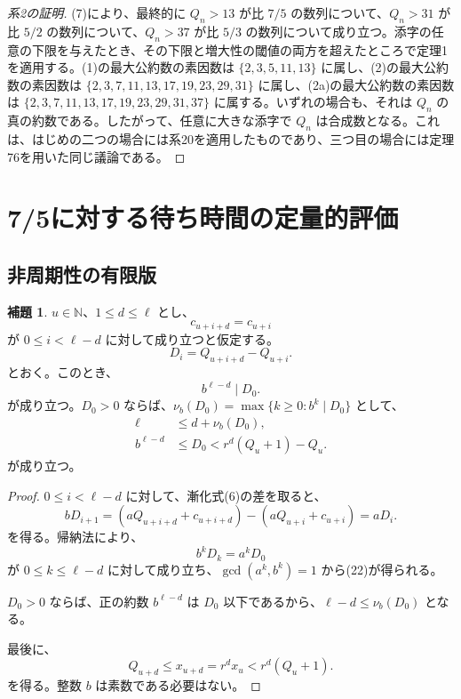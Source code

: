\documentclass[11pt,reqno]{amsart}
\theoremstyle{definition}
\newtheorem{lemma}[theorem]{補題}
\theoremstyle{definition}
\theoremstyle{remark}
\begin{document}
\begin{proof}[系2の証明]\leavevmode\label{proof:2}
(7)により、最終的に \(Q_n>13\) が比 \(7/5\) の数列について、\(Q_n>31\) が比 \(5/2\) の数列について、\(Q_n>37\) が比 \(5/3\) の数列について成り立つ。添字の任意の下限を与えたとき、その下限と増大性の閾値の両方を超えたところで定理1を適用する。(1)の最大公約数の素因数は \(\{2,3,5,11,13\}\) に属し、(2)の最大公約数の素因数は \(\{2,3,7,11,13,17,19,23,29,31\}\) に属し、(2a)の最大公約数の素因数は \(\{2,3,7,11,13,17,19,23,29,31,37\}\) に属する。いずれの場合も、それは \(Q_n\) の真の約数である。したがって、任意に大きな添字で \(Q_n\) は合成数となる。これは、はじめの二つの場合には系20を適用したものであり、三つ目の場合には定理76を用いた同じ議論である。\qedhere
\end{proof}

\section{7/5に対する待ち時間の定量的評価}\label{sec:6}

\subsection{非周期性の有限版}\label{sec:6.1}

\begin{samepage}
\begin{lemma}\leavevmode\label{thm:25}
\(u\in\mathbb N\)、\(1\le d\le\ell\) とし、
\[
c_{u+i+d}=c_{u+i}
\]
が \(0\le i<\ell-d\) に対して成り立つと仮定する。
\[
D_i=Q_{u+i+d}-Q_{u+i}.
\]
とおく。このとき、
\[
b^{\ell-d}\mid D_0.
\tag{22}\label{eq:22}
\]
が成り立つ。\(D_0>0\) ならば、\(\nu_b(D_0)=\max\{k\ge0:b^k\mid D_0\}\) として、
\[
\begin{aligned}
\ell&\le d+\nu_b(D_0),\\
b^{\ell-d}&\le D_0<r^d(Q_u+1)-Q_u.
\end{aligned}
\tag{23}\label{eq:23}
\]
が成り立つ。
\label{thm-end:25}
\end{lemma}
\end{samepage}

\begin{proof}\leavevmode\label{proof:25}
\(0\le i<\ell-d\) に対して、漸化式(6)の差を取ると、
\[
bD_{i+1}=(aQ_{u+i+d}+c_{u+i+d})-(aQ_{u+i}+c_{u+i})=aD_i.
\]
を得る。帰納法により、
\[
b^kD_k=a^kD_0
\]
が \(0\le k\le\ell-d\) に対して成り立ち、\(\gcd(a^k,b^k)=1\) から(22)が得られる。

\(D_0>0\) ならば、正の約数 \(b^{\ell-d}\) は \(D_0\) 以下であるから、\(\ell-d\le\nu_b(D_0)\) となる。

最後に、
\[
Q_{u+d}\le x_{u+d}=r^dx_u<r^d(Q_u+1).
\]
を得る。整数 \(b\) は素数である必要はない。\qedhere
\end{proof}
\end{document}
